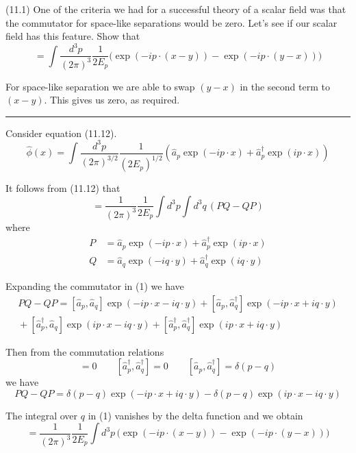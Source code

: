 \documentclass[12pt]{article}
\begin{document}
(11.1)
One of the criteria we had for a successful theory
of a scalar field was that the commutator for space-like
separations would be zero. Let's see if our scalar
field has this feature. Show that
\begin{equation*}
[\hat\phi(x),\hat\phi(y)]=\int
\frac{d^3p}{(2\pi)^3}\frac{1}{2E_p}
\big(
\exp(-ip\cdot(x-y))-\exp(-ip\cdot(y-x))
\big)
\tag{11.51}
\end{equation*}

For space-like separation we are able to swap $(y-x)$
in the second term to $(x-y)$. This gives us zero,
as required.

\bigskip
\hrule

\bigskip
Consider equation (11.12).
\begin{equation*}
\hat\phi(x)=\int\frac{d^3p}{(2\pi)^{3/2}}\frac{1}{(2E_p)^{1/2}}
\left(\hat a_p\exp(-ip\cdot x)+\hat a_p^\dag\exp(ip\cdot x)\right)
\tag{11.12}
\end{equation*}

It follows from (11.12) that
\begin{equation*}
[\hat\phi(x),\hat\phi(y)]=\frac{1}{(2\pi)^3}\frac{1}{2E_p}
\int d^3p\int d^3q\,(PQ-QP)
\tag{1}
\end{equation*}
where
\begin{align*}
P&=\hat a_p\exp(-ip\cdot x)+\hat a_p^\dag\exp(ip\cdot x)
\\
Q&=\hat a_q\exp(-iq\cdot y)+\hat a_q^\dag\exp(iq\cdot y)
\end{align*}

Expanding the commutator in (1) we have
\begin{multline*}
PQ-QP=
[\hat a_p,\hat a_q]\exp(-ip\cdot x-iq\cdot y)
+[\hat a_p,\hat a_q^\dag]\exp(-ip\cdot x+iq\cdot y)
\\
{}+[\hat a_p^\dag,\hat a_q]\exp(ip\cdot x-iq\cdot y)
+[\hat a_p^\dag,\hat a_q^\dag]\exp(ip\cdot x+iq\cdot y)
\end{multline*}

Then from the commutation relations
\begin{equation*}
[\hat a_p,\hat a_q]=0
\qquad
[\hat a_p^\dag,\hat a_q^\dag]=0
\qquad
[\hat a_p,\hat a_q^\dag]=\delta(p-q)
\end{equation*}
we have
\begin{equation*}
PQ-QP=\delta(p-q)\exp(-ip\cdot x+iq\cdot y)-\delta(p-q)\exp(ip\cdot x-iq\cdot y)
\end{equation*}

The integral over $q$ in (1) vanishes by the delta function and we obtain
\begin{equation*}
[\hat\phi(x),\hat\phi(y)]=\frac{1}{(2\pi)^3}\frac{1}{2E_p}
\int d^3p\,\big(\exp(-ip\cdot(x-y))-\exp(-ip\cdot(y-x))\big)
\end{equation*}
\end{document}
